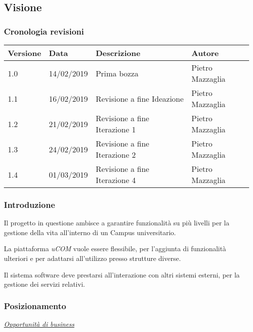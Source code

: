 \subsection{Visione}

\subsubsection{Cronologia revisioni}


\begin{table}[htb]
	\begin{tabular}{|l|l|l|l|}
		\hline
		
		\textbf{Versione} & \textbf{Data}       & \textbf{Descrizione} & \textbf{Autore}           \\ \hline
		
		1.0      & 14/02/2019 & Prima bozza & Pietro Mazzaglia \\ \hline
		1.1      & 16/02/2019 & Revisione a fine Ideazione & Pietro Mazzaglia \\ \hline
		1.2      & 21/02/2019 & Revisione a fine Iterazione 1 & Pietro Mazzaglia \\ \hline
		1.3      & 24/02/2019 & Revisione a fine Iterazione 2 & Pietro Mazzaglia \\ \hline
		1.4      & 01/03/2019 & Revisione a fine Iterazione 4 & Pietro Mazzaglia \\ \hline		
	\end{tabular}
\end{table}

\subsubsection{Introduzione}

Il progetto in questione ambisce a garantire funzionalità su più livelli per la gestione della vita all'interno di un Campus universitario. 

La piattaforma \textit{uCOM} vuole essere flessibile, per l'aggiunta di funzionalità ulteriori e per adattarsi all'utilizzo presso strutture diverse. 

Il sistema software deve prestarsi all'interazione con altri sistemi esterni, per la gestione dei servizi relativi.

\subsubsection{Posizionamento}

\underline{\textit{Opportunità di business}}

